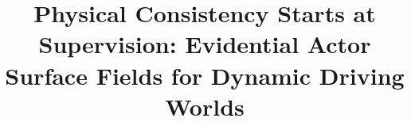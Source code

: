 \title{Physical Consistency Starts at Supervision: Evidential Actor Surface Fields for Dynamic Driving Worlds}
